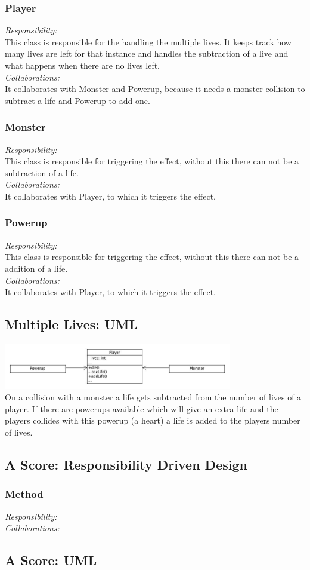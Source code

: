 \subsubsection{Player}
\textit{Responsibility:} \\
This class is responsible for the handling the multiple lives. It keeps track how many lives are left for that instance and handles the subtraction of a live and what happens when there are no lives left. \\
\textit{Collaborations:} \\
It collaborates with Monster and Powerup, because it needs a monster collision to subtract a life and Powerup to add one.

\subsubsection{Monster}
\textit{Responsibility:} \\
This class is responsible for triggering the effect, without this there can not be a subtraction of a life. \\
\textit{Collaborations:} \\
It collaborates with Player, to which it triggers the effect.

\subsubsection{Powerup}
\textit{Responsibility:} \\
This class is responsible for triggering the effect, without this there can not be a addition of a life. \\
\textit{Collaborations:} \\
It collaborates with Player, to which it triggers the effect.

\subsection{Multiple Lives: UML}

\includegraphics[width=100mm]{uml_multiple_lives.jpg}\\[1cm]
On a collision with a monster a life gets subtracted from the number of lives of a player. If there are powerups available which will give an extra life and the players collides with this powerup (a heart) a life is added to the players number of lives.

\subsection{A Score: Responsibility Driven Design}


\subsubsection{Method}
\textit{Responsibility:} \\
\textit{Collaborations:}

\subsection{A Score: UML}
